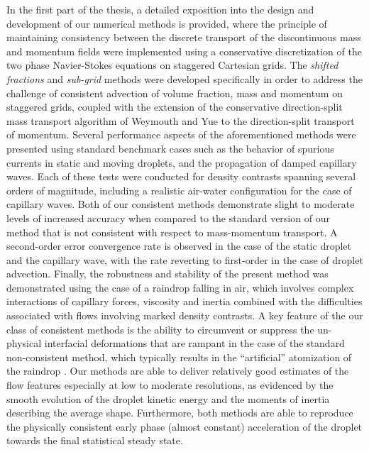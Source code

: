 In the first part of the thesis, a detailed exposition into the design and 
development of our numerical methods is provided, where the principle 
of maintaining consistency between the discrete transport of
the discontinuous mass and momentum fields were implemented  
using a conservative discretization of the two phase 
Navier-Stokes equations on staggered Cartesian grids. 
The \textit{shifted fractions} and \textit{sub-grid} methods were developed
specifically in order to address the challenge of consistent 
advection of volume fraction, mass and momentum on staggered grids,
coupled with the extension of the conservative direction-split mass transport
algorithm of Weymouth and Yue \cite{wy} to the direction-split transport of momentum.
Several performance aspects of the aforementioned methods were presented using 
standard benchmark cases such as the behavior of spurious currents in static and
moving droplets, and the propagation of damped capillary waves. 
Each of these tests were conducted for density contrasts spanning several orders of magnitude, 
including a realistic air-water configuration for the case of capillary waves. 
Both of our consistent methods demonstrate slight to moderate levels of increased accuracy
when compared to the standard version of our method that is not 
consistent with respect to mass-momentum transport. 
A second-order error convergence rate is observed in the case of the 
static droplet and the capillary wave, with the rate
reverting to first-order in the case of droplet advection.
Finally, the robustness and stability of the present method was demonstrated
using the case of a raindrop falling in air, which involves complex interactions
of capillary forces, viscosity and inertia combined with the difficulties associated
with flows involving marked density contrasts.  
A key feature of the our class of consistent methods is the ability to circumvent 
or suppress the un-physical interfacial deformations that are rampant 
in the case of the standard non-consistent method, which typically results in the 
``artificial'' atomization of the raindrop .
Our methods are able to deliver relatively good estimates of the flow features 
especially at low to moderate resolutions, as evidenced by the smooth evolution 
of the droplet kinetic energy and the moments of inertia describing the average shape. 
Furthermore, both methods are able to reproduce the physically consistent early phase 
(almost constant) acceleration of the droplet towards the final statistical steady state.  

